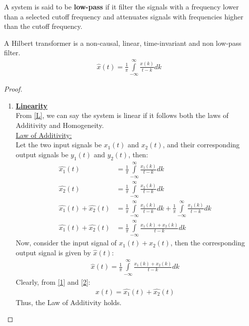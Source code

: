 \documentclass[journal,12pt,twocolumn]{IEEEtran}
\begin{document}
\begin{definition}
A system is said to be \textbf{low-pass} if it filter the signals with a frequency lower than a selected cutoff frequency and attenuates signals with frequencies higher than the cutoff frequency. \label{newdef}
\end{definition}

\begin{lemma}
A Hilbert transformer is a non-causal, linear, time-invariant and non low-pass filter.
\begin{align}
     \hat{x}(t)= \frac{1}{\pi}\int\limits_{-\infty}^{\infty}\frac{x(k)}{t-k} dk
\end{align}
\end{lemma}
\begin{proof}
\begin{enumerate}
\item \textbf{\underline{Linearity}}\\
From \eqref{L}, we can say the system is linear if it follows both the laws of Additivity and Homogeneity.\\
\underline{Law of Additivity:}\\
Let the two input signals be $x_1(t)$ and $x_2(t)$, and their corresponding output signals be $y_1(t)$ and $y_2(t)$, then:
\begin{align}
    \hat{x_1}(t)&= \frac{1}{\pi}\int\limits_{-\infty}^{\infty}\frac{x_1(k)}{t-k} dk\\
    \hat{x_2}(t)&= \frac{1}{\pi}\int\limits_{-\infty}^{\infty}\frac{x_2(k)}{t-k} dk\\
    \nonumber\hat{x_1}(t)+\hat{x_2}(t) &= \frac{1}{\pi}\int\limits_{-\infty}^{\infty}\frac{x_1(k)}{t-k} dk+\frac{1}{\pi}\int\limits_{-\infty}^{\infty}\frac{x_1(k)}{t-k} dk\\
    \hat{x_1}(t)+\hat{x_2}(t) &= \frac{1}{\pi}\int\limits_{-\infty}^{\infty}\frac{x_1(k)+x_2(k)}{t-k} dk
    \label{1}
\end{align}
Now, consider the input signal of $x_1(t) + x_2(t)$, then the corresponding output signal is given by $\hat{x}(t)$:
\begin{align}
    \hat{x}(t) = \frac{1}{\pi}\int\limits_{-\infty}^{\infty}\frac{x_1(k)+x_2(k)}{t-k} dk
    \label{2}
\end{align}
Clearly, from \eqref{1} and \eqref{2}:
\begin{align}
    \hat{x}(t) = \hat{x_1}(t) + \hat{x_2}(t)
\end{align}
Thus, the Law of Additivity holds.\\

\end{enumerate}
\end{proof}
\end{document}
